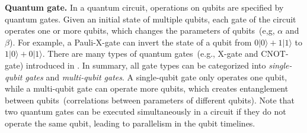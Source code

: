 \textbf{Quantum gate.}
In a quantum circuit, operations on qubits are specified by quantum gates.
Given an initial state of multiple qubits, each gate of the circuit operates one or more qubits, which changes the parameters of qubits~(e,g, $\alpha$ and $\beta$).
For example, a Pauli-X-gate can invert the state of a qubit from $0|0\rangle + 1|1\rangle$ to $1|0\rangle + 0|1\rangle$.
There are many types of quantum gates~(e.g., X-gate and CNOT-gate) introduced in \cite{Nielsen:2010:QCBook}.
In summary, all gate types can be categorized into \textit{single-qubit gates} and \textit{multi-qubit gates}.
A single-qubit gate only operates one qubit, while a multi-qubit gate can operate more qubits, which creates entanglement between qubits~(correlations between parameters of different qubits).
Note that two quantum gates can be executed simultaneously in a circuit if they do not operate the same qubit, leading to parallelism in the qubit timelines.



